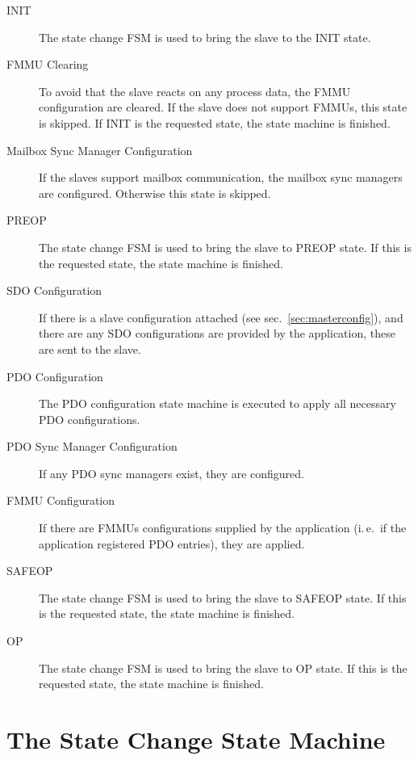 \documentclass[a4paper,12pt,BCOR6mm,bibtotoc,idxtotoc]{scrbook}
\begin{document}
\begin{description}

\item[INIT] The state change FSM is used to bring the slave to the INIT state.

\item[FMMU Clearing] To avoid that the slave reacts on any process data, the
FMMU configuration are cleared. If the slave does not support FMMUs, this
state is skipped. If INIT is the requested state, the state machine is
finished.

\item[Mailbox Sync Manager Configuration] If the slaves support mailbox
communication, the mailbox sync managers are configured. Otherwise this state
is skipped.

\item[PREOP] The state change FSM is used to bring the slave to PREOP state.
If this is the requested state, the state machine is finished.

\item[SDO Configuration] If there is a slave configuration attached (see
sec.~\ref{sec:masterconfig}), and there are any SDO configurations are
provided by the application, these are sent to the slave.

\item[PDO Configuration] The PDO configuration state machine is executed to
apply all necessary PDO configurations.

\item[PDO Sync Manager Configuration] If any PDO sync managers exist, they are
configured.

\item[FMMU Configuration] If there are FMMUs configurations supplied by the
application (i.\,e.\ if the application registered PDO entries), they are
applied. 

\item[SAFEOP] The state change FSM is used to bring the slave to SAFEOP state.
If this is the requested state, the state machine is finished.

\item[OP] The state change FSM is used to bring the slave to OP state.
If this is the requested state, the state machine is finished.

\end{description}


\section{The State Change State Machine}
\label{sec:fsm-change}
\end{document}
